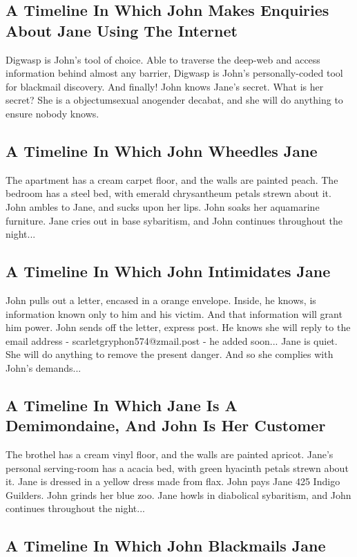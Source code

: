 \documentclass{article}
\begin{document}
\subsection{A Timeline In Which John Makes Enquiries About Jane Using The Internet}


Digwasp is John's tool of choice. Able to traverse the deep{-}web and access information behind almost any barrier, Digwasp is John's personally{-}coded tool for blackmail discovery.
And finally!
John knows Jane's secret. What is her secret? She is a objectumsexual anogender decabat, and she will do anything to ensure nobody knows.
\subsection{A Timeline In Which John Wheedles Jane}


The apartment has a cream carpet floor, and the walls are painted peach.
The bedroom has a steel bed, with emerald chrysantheum petals strewn about it.
John ambles to Jane, and sucks upon her lips.
John soaks her aquamarine furniture.
Jane cries out in base sybaritism, and John continues throughout the night...
\subsection{A Timeline In Which John Intimidates Jane}


John pulls out a letter, encased in a orange envelope. Inside, he knows, is information known only to him and his victim. And that information will grant him power.
John sends off the letter, express post. He knows she will reply to the email address {-} scarletgryphon574@zmail.post {-} he added soon...
Jane is quiet. She will do anything to remove the present danger. And so she complies with John's demands...
\subsection{A Timeline In Which Jane Is A Demimondaine, And John Is Her Customer}


The brothel has a cream vinyl floor, and the walls are painted apricot.
Jane's personal serving{-}room has a acacia bed, with green hyacinth petals strewn about it.
Jane is dressed in a yellow dress made from flax.
John pays Jane 425 Indigo Guilders.
John grinds her blue zoo.
Jane howls in diabolical sybaritism, and John continues throughout the night...
\subsection{A Timeline In Which John Blackmails Jane}
\end{document}
